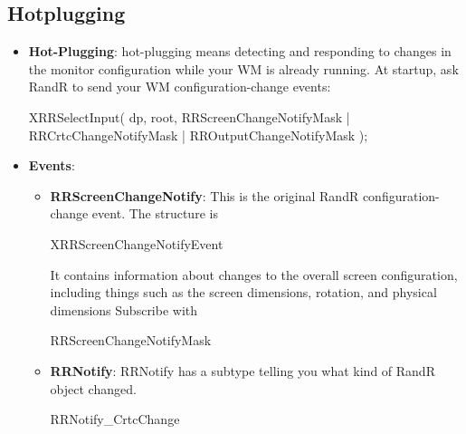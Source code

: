 \documentclass{report}
\begin{document}
            \subsection{Hotplugging}
            \begin{itemize}
                \item \textbf{Hot-Plugging}: hot-plugging means detecting and responding to changes in the monitor configuration while your WM is already running.
                    \bigbreak \noindent 
                    At startup, ask RandR to send your WM configuration-change events:
                    \bigbreak \noindent 
                    \begin{cppcode}
                        XRRSelectInput(
                            dp,
                            root,
                            RRScreenChangeNotifyMask |
                            RRCrtcChangeNotifyMask |
                            RROutputChangeNotifyMask
                        );
                    \end{cppcode}
                \item \textbf{Events}: 
                    \begin{itemize}
                        \item \textbf{RRScreenChangeNotify}: This is the original RandR configuration-change event. The structure is
                            \bigbreak \noindent 
                            \begin{cppcode}
                            XRRScreenChangeNotifyEvent
                            \end{cppcode}
                            \bigbreak \noindent 
                            It contains information about changes to the overall screen configuration, including things such as the screen dimensions, rotation, and physical dimensions
                            \bigbreak \noindent 
                            Subscribe with
                            \bigbreak \noindent 
                            \begin{cppcode}
                                RRScreenChangeNotifyMask
                            \end{cppcode}
                        \item \textbf{RRNotify}: RRNotify has a subtype telling you what kind of RandR object changed.
                            \bigbreak \noindent 
                            \begin{cppcode}
                            RRNotify_CrtcChange

\end{cppcode}
\end{itemize}
\end{itemize}
\end{document}

